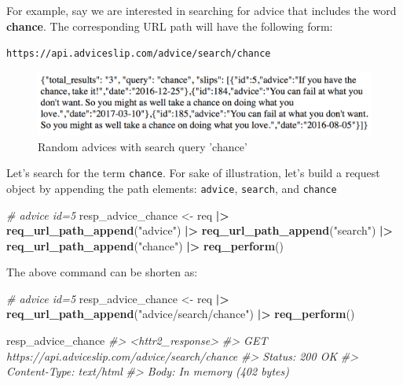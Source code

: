 \documentclass[
]{book}
\newenvironment{Shaded}{\begin{snugshade}}{\end{snugshade}}
\newcommand{\CommentTok}[1]{\textcolor[rgb]{0.56,0.35,0.01}{\textit{#1}}}
\newcommand{\FunctionTok}[1]{\textcolor[rgb]{0.13,0.29,0.53}{\textbf{#1}}}
\newcommand{\NormalTok}[1]{#1}
\newcommand{\OtherTok}[1]{\textcolor[rgb]{0.56,0.35,0.01}{#1}}
\newcommand{\SpecialCharTok}[1]{\textcolor[rgb]{0.81,0.36,0.00}{\textbf{#1}}}
\newcommand{\StringTok}[1]{\textcolor[rgb]{0.31,0.60,0.02}{#1}}
\begin{document}
For example, say we are interested in searching for advice that includes the
word \textbf{chance}. The corresponding URL path will have the following form:

\texttt{https://api.adviceslip.com/advice/search/chance}

\begin{figure}

{\centering \includegraphics[width=0.75\linewidth]{images/api/advice-slip-chance} 

}

\caption{Random advices with search query 'chance'}\label{fig:unnamed-chunk-135}
\end{figure}

Let's search for the term \texttt{chance}. For sake of illustration, let's build a
request object by appending the path elements: \texttt{advice}, \texttt{search}, and \texttt{chance}

\begin{Shaded}
\begin{Highlighting}[]
\CommentTok{\# advice id=5}
\NormalTok{resp\_advice\_chance }\OtherTok{\textless{}{-}}\NormalTok{ req }\SpecialCharTok{|\textgreater{}}
  \FunctionTok{req\_url\_path\_append}\NormalTok{(}\StringTok{"advice"}\NormalTok{) }\SpecialCharTok{|\textgreater{}}
  \FunctionTok{req\_url\_path\_append}\NormalTok{(}\StringTok{"search"}\NormalTok{) }\SpecialCharTok{|\textgreater{}}
  \FunctionTok{req\_url\_path\_append}\NormalTok{(}\StringTok{"chance"}\NormalTok{) }\SpecialCharTok{|\textgreater{}}
  \FunctionTok{req\_perform}\NormalTok{()}
\end{Highlighting}
\end{Shaded}

The above command can be shorten as:

\begin{Shaded}
\begin{Highlighting}[]
\CommentTok{\# advice id=5}
\NormalTok{resp\_advice\_chance }\OtherTok{\textless{}{-}}\NormalTok{ req }\SpecialCharTok{|\textgreater{}}
  \FunctionTok{req\_url\_path\_append}\NormalTok{(}\StringTok{"advice/search/chance"}\NormalTok{) }\SpecialCharTok{|\textgreater{}}
  \FunctionTok{req\_perform}\NormalTok{()}

\NormalTok{resp\_advice\_chance}
\CommentTok{\#\textgreater{} \textless{}httr2\_response\textgreater{}}
\CommentTok{\#\textgreater{} GET https://api.adviceslip.com/advice/search/chance}
\CommentTok{\#\textgreater{} Status: 200 OK}
\CommentTok{\#\textgreater{} Content{-}Type: text/html}
\CommentTok{\#\textgreater{} Body: In memory (402 bytes)}
\end{Highlighting}
\end{Shaded}
\end{document}
